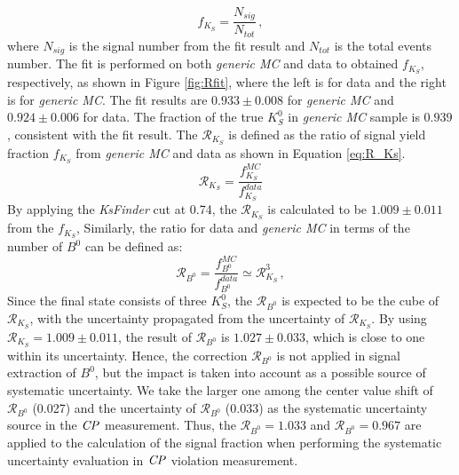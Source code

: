 \begin{equation}\label{eq:S_ratio}
	f_{K_S} = \frac{N_{sig}}{N_{tot}}\, ,
\end{equation}
where $N_{sig}$ is the signal number from the fit result and $N_{tot}$ is the total events number.
The fit is performed on both \textit{generic MC} and data to obtained $f_{K_S} $, respectively, as shown in Figure \ref{fig:Rfit}, where the left is for data and the right is for \textit{generic MC}. The fit results are $0.933\pm0.008$ for \textit{generic MC} and $0.924\pm 0.006$ for data. The fraction of the true $K_S^0$ in \textit{generic MC} sample is $0.939$, consistent with the fit result.
The $\mathcal{R}_{K_S}$ is defined as the ratio of signal yield fraction  $f_{K_S} $ from \textit{generic MC} and data as shown in Equation \ref{eq:R_Ks}. 
\begin{equation}\label{eq:R_Ks}
\mathcal{R}_{K_S} = \frac{f_{K_S}^{MC}}{f_{K_S}^{data}}
\end{equation}
By applying the \textit{KsFinder} cut at 0.74, the $\mathcal{R}_{K_S}$ is calculated to be $1.009\pm 0.011$ from the $f_{K_S}$,  Similarly, the ratio for data and \textit{generic MC} in terms of the number of $B^0$ can be defined as: 
\begin{equation}\label{eq:R_B}
\mathcal{R}_{B^0} = \frac{f_{B^0}^{MC}}{f_{B^0}^{data}} \simeq \mathcal{R}_{K_S}^3 \, ,
\end{equation}
Since the final state consists of three $K_S^0$, the $\mathcal{R}_{B^0}$ is expected to be the cube of $\mathcal{R}_{K_S}$, with the uncertainty propagated from the uncertainty of $\mathcal{R}_{K_S}$. By using  $\mathcal{R}_{K_S} = 1.009\pm 0.011$, the result of $\mathcal{R}_{B^0}$ is $1.027 \pm 0.033$, which is close to one within its uncertainty. Hence, the correction $\mathcal{R}_{B^0}$ is not applied in signal extraction of $B^0$, but the impact is taken into account as a possible source of systematic uncertainty. We take the larger one among the center value shift of $\mathcal{R}_{B^0}$ (0.027) and the uncertainty of $\mathcal{R}_{B^0}$ (0.033) as the systematic uncertainty source in the $\it{CP}$ measurement. Thus, the $\mathcal{R}_{B^0} = 1.033$ and  $\mathcal{R}_{B^0} = 0.967$ are applied to the calculation of the signal fraction when performing the systematic uncertainty evaluation in $\it{CP}$ violation measurement.




